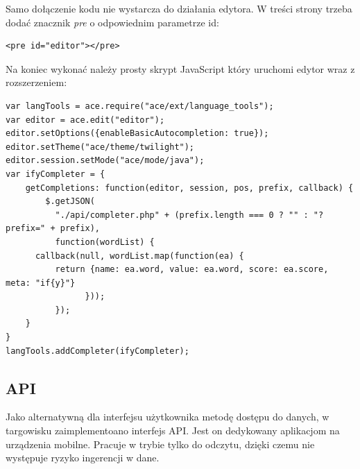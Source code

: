 \documentclass[11pt,a4paper,polish,thesis]{dcsbook}
\begin{document}
Samo dołączenie kodu nie wystarcza do działania edytora. W treści strony trzeba dodać znacznik \emph{pre} o odpowiednim parametrze id:
\begin{verbatim}
<pre id="editor"></pre>
\end{verbatim}

Na koniec wykonać należy prosty skrypt JavaScript który uruchomi edytor wraz z rozszerzeniem:
\begin{verbatim}
var langTools = ace.require("ace/ext/language_tools");
var editor = ace.edit("editor");
editor.setOptions({enableBasicAutocompletion: true});
editor.setTheme("ace/theme/twilight");
editor.session.setMode("ace/mode/java");
var ifyCompleter = {
    getCompletions: function(editor, session, pos, prefix, callback) {
        $.getJSON(
          "./api/completer.php" + (prefix.length === 0 ? "" : "?prefix=" + prefix),
          function(wordList) {
      callback(null, wordList.map(function(ea) {
          return {name: ea.word, value: ea.word, score: ea.score, meta: "if{y}"}
                }));
          });
    }
}
langTools.addCompleter(ifyCompleter);
\end{verbatim}
\subsection{API}
Jako alternatywną dla interfejsu użytkownika metodę dostępu do danych, w targowisku zaimplementoano interfejs API. Jest on dedykowany aplikacjom na urządzenia mobilne.
Pracuje w trybie tylko do odczytu, dzięki czemu nie występuje ryzyko ingerencji w dane.
\end{document}
